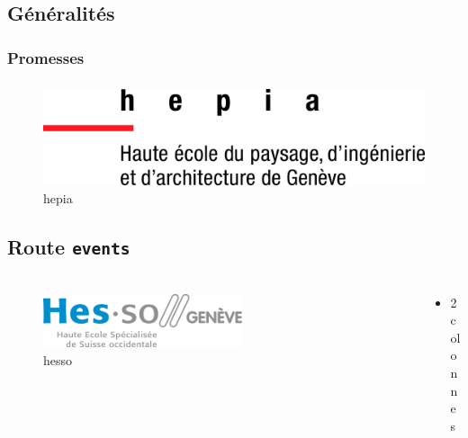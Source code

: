 \documentclass{beamer}
\begin{document}
\subsection{Généralités}
\subsubsection{Promesses}
\begin{frame}
	\frametitle{\subsecname}
	\framesubtitle{\subsubsecname}    
	\begin{figure}
		\begin{center}
			\includegraphics[width=1.0\textwidth]{images/hepia.jpg}
		\end{center}
		\caption{hepia}
	\end{figure}
\end{frame}


\subsection{Route \texttt{events}}
\begin{frame}
	\frametitle{\subsecname}
	\framesubtitle{\subsubsecname}
	\begin{columns}[T]
		\begin{column}{.25\textwidth}
			\begin{figure}
				\includegraphics[width=0.6\textwidth]{images/hesso.jpg}
				\caption{hesso}
			\end{figure}
		\end{column}
		\begin{column}{.75\textwidth}
			\begin{itemize}
				\item 2 colonnes
			\end{itemize}
		\end{column}
	\end{columns}
\end{frame}
\end{document}
